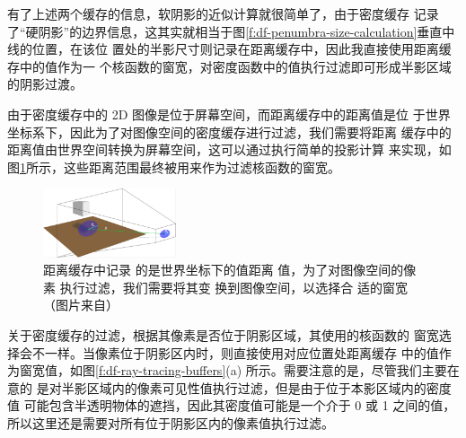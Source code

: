 有了上述两个缓存的信息，软阴影的近似计算就很简单了，由于密度缓存 记录了“硬阴影”的边界信息，这其实就相当于图\ref{f:df-penumbra-size-calculation}垂直中线的位置，在该位 置处的半影尺寸则记录在距离缓存中，因此我直接使用距离缓存中的值作为一 个核函数的窗宽，对密度函数中的值执行过滤即可形成半影区域的阴影过渡。

由于密度缓存中的 2D 图像是位于屏幕空间，而距离缓存中的距离值是位 于世界坐标系下，因此为了对图像空间的密度缓存进行过滤，我们需要将距离 缓存中的距离值由世界空间转换为屏幕空间，这可以通过执行简单的投影计算 来实现，如图\ref{f:df-kernel-width-section}所示，这些距离范围最终被用来作为过滤核函数的窗宽。

\begin{figure}
\sidecaption
	\includegraphics[width=0.35\textwidth]{figures/shadows/kernel-width-section}
	\caption{距离缓存中记录 的是世界坐标下的值距离 值，为了对图像空间的像素 执行过滤，我们需要将其变 换到图像空间，以选择合 适的窗宽（图片来自\cite{a:Implementingfastraytracedsoftshadowsinagameengine}）}
	\label{f:df-kernel-width-section}
\end{figure}

关于密度缓存的过滤，根据其像素是否位于阴影区域，其使用的核函数的 窗宽选择会不一样。当像素位于阴影区内时，则直接使用对应位置处距离缓存 中的值作为窗宽值，如图\ref{f:df-ray-tracing-buffers}(a) 所示。需要注意的是，尽管我们主要在意的 是对半影区域内的像素可见性值执行过滤，但是由于位于本影区域内的密度值 可能包含半透明物体的遮挡，因此其密度值可能是一个介于 0 或 1 之间的值， 所以这里还是需要对所有位于阴影区内的像素值执行过滤。

